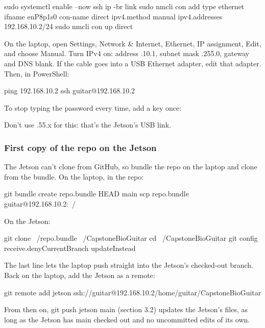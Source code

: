\documentclass[11pt,letterpaper]{article}
\newcommand{\code}[1]{\textcolor{codeblue}{\ttfamily\smaller\relax #1}}
\begin{document}
\begin{codeblock}
sudo systemctl enable --now ssh
ip -br link
sudo nmcli con add type ethernet ifname enP8p1s0 con-name direct ipv4.method manual ipv4.addresses 192.168.10.2/24
sudo nmcli con up direct
\end{codeblock}
On the laptop, open Settings, Network \& Internet, Ethernet, IP assignment, Edit, and choose Manual. Turn IPv4 on: address \code{192.168.10.1}, subnet mask \code{255.255.255.0}, gateway and DNS blank. If the cable goes into a USB Ethernet adapter, edit that adapter. Then, in PowerShell:

\begin{codeblock}
ping 192.168.10.2
ssh guitar@192.168.10.2
\end{codeblock}
To stop typing the password every time, add a key once:

Don't use \code{192.168.55.x} for this: that's the Jetson's USB link.

\subsubsection*{First copy of the repo on the Jetson}
The Jetson can't clone from GitHub, so bundle the repo on the laptop and clone from the bundle. On the laptop, in the repo:

\begin{codeblock}
git bundle create repo.bundle HEAD main
scp repo.bundle guitar@192.168.10.2:~/
\end{codeblock}
On the Jetson:

\begin{codeblock}
git clone ~/repo.bundle ~/CapstoneBioGuitar
cd ~/CapstoneBioGuitar
git config receive.denyCurrentBranch updateInstead
\end{codeblock}
The last line lets the laptop push straight into the Jetson's checked-out branch. Back on the laptop, add the Jetson as a remote:

\begin{codeblock}
git remote add jetson ssh://guitar@192.168.10.2/home/guitar/CapstoneBioGuitar
\end{codeblock}
From then on, \code{git push jetson main} (section 3.2) updates the Jetson's files, as long as the Jetson has \code{main} checked out and no uncommitted edits of its own.
\end{document}
